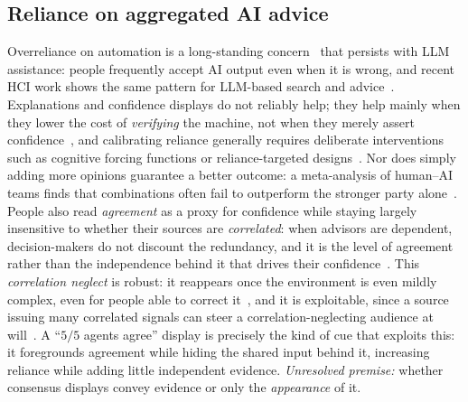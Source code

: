 \documentclass[acmsmall,screen,nonacm]{acmart}
\begin{document}
\subsection{Reliance on aggregated AI advice}
Overreliance on automation is a long-standing concern~\cite{parasuraman1997,skitka1999} that persists with
LLM assistance: people frequently accept AI output even when it is wrong, and recent HCI work shows the same
pattern for LLM-based search and advice~\cite{spatharioti2025llmsearch}. Explanations and confidence displays
do not reliably help; they help mainly when they lower the cost of \emph{verifying} the machine, not when
they merely assert confidence~\cite{vasconcelos2023explanations,bansal2021whole}, and calibrating reliance
generally requires deliberate interventions such as cognitive forcing functions or reliance-targeted
designs~\cite{buccinca2021trust,bo2025rely}. Nor does simply adding more opinions
guarantee a better outcome: a meta-analysis of human--AI teams finds that combinations often fail to
outperform the stronger party alone~\cite{vaccaro2024combinations}. People also read \emph{agreement} as a
proxy for confidence while staying largely insensitive to whether their sources are \emph{correlated}: when
advisors are dependent, decision-makers do not discount the redundancy, and it is the level of agreement
rather than the independence behind it that drives their confidence~\cite{budescu2007aggregation}. This
\emph{correlation neglect} is robust: it reappears once the environment is even mildly complex, even for
people able to correct it~\cite{enke2019correlation}, and it is exploitable, since a source issuing many
correlated signals can steer a correlation-neglecting audience at will~\cite{levy2022persuasion}. A
``$5/5$ agents agree'' display is precisely the kind of cue that exploits this: it foregrounds agreement
while hiding the shared input behind it, increasing reliance while adding little independent evidence.
\emph{Unresolved premise:} whether consensus displays convey evidence or only the \emph{appearance} of it.
\end{document}
